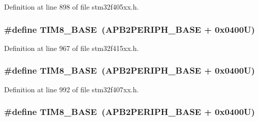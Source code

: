 Definition at line 898 of file stm32f405xx.\+h.

\subsubsection[{\texorpdfstring{T\+I\+M8\+\_\+\+B\+A\+SE}{TIM8_BASE}}]{\setlength{\rightskip}{0pt plus 5cm}\#define T\+I\+M8\+\_\+\+B\+A\+SE~({\bf A\+P\+B2\+P\+E\+R\+I\+P\+H\+\_\+\+B\+A\+SE} + 0x0400\+U)}\hypertarget{group___peripheral__registers__structures_ga5b72f698b7a048a6f9fcfe2efe5bc1db}{}\label{group___peripheral__registers__structures_ga5b72f698b7a048a6f9fcfe2efe5bc1db}


Definition at line 967 of file stm32f415xx.\+h.

\subsubsection[{\texorpdfstring{T\+I\+M8\+\_\+\+B\+A\+SE}{TIM8_BASE}}]{\setlength{\rightskip}{0pt plus 5cm}\#define T\+I\+M8\+\_\+\+B\+A\+SE~({\bf A\+P\+B2\+P\+E\+R\+I\+P\+H\+\_\+\+B\+A\+SE} + 0x0400\+U)}\hypertarget{group___peripheral__registers__structures_ga5b72f698b7a048a6f9fcfe2efe5bc1db}{}\label{group___peripheral__registers__structures_ga5b72f698b7a048a6f9fcfe2efe5bc1db}


Definition at line 992 of file stm32f407xx.\+h.

\subsubsection[{\texorpdfstring{T\+I\+M8\+\_\+\+B\+A\+SE}{TIM8_BASE}}]{\setlength{\rightskip}{0pt plus 5cm}\#define T\+I\+M8\+\_\+\+B\+A\+SE~({\bf A\+P\+B2\+P\+E\+R\+I\+P\+H\+\_\+\+B\+A\+SE} + 0x0400\+U)}\hypertarget{group___peripheral__registers__structures_ga5b72f698b7a048a6f9fcfe2efe5bc1db}{}\label{group___peripheral__registers__structures_ga5b72f698b7a048a6f9fcfe2efe5bc1db}


